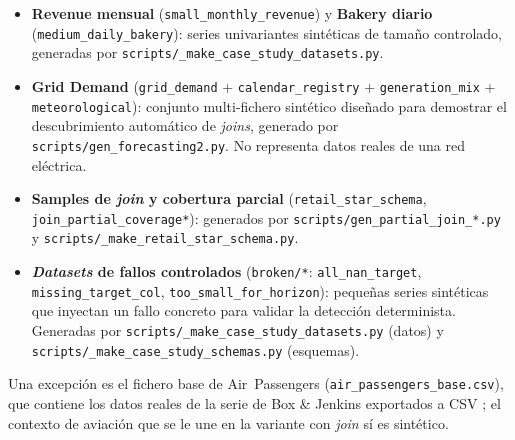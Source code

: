 \begin{itemize}
  \item \textbf{Revenue mensual} (\texttt{small\_monthly\_revenue}) y
        \textbf{Bakery diario} (\texttt{medium\_daily\_bakery}): series univariantes
        sintéticas de tamaño controlado, generadas por
        \texttt{scripts/\_make\_case\_study\_datasets.py}.
  \item \textbf{Grid Demand} (\texttt{grid\_demand} + \texttt{calendar\_registry} +
        \texttt{generation\_mix} + \texttt{meteorological}): conjunto multi-fichero
        sintético diseñado para demostrar el descubrimiento automático de \textit{joins},
        generado por \texttt{scripts/gen\_forecasting2.py}. No representa datos reales
        de una red eléctrica.
  \item \textbf{Samples de \textit{join} y cobertura parcial}
        (\texttt{retail\_star\_schema}, \texttt{join\_partial\_coverage*}): generados por
        \texttt{scripts/gen\_partial\_join\_*.py} y
        \texttt{scripts/\_make\_retail\_star\_schema.py}.
  \item \textbf{\textit{Datasets} de fallos controlados} (\texttt{broken/*}:
        \texttt{all\_nan\_target}, \texttt{missing\_target\_col},
        \texttt{too\_small\_for\_horizon}): pequeñas series sintéticas que inyectan un
        fallo concreto para validar la detección determinista. Generadas por
        \texttt{scripts/\_make\_case\_study\_datasets.py} (datos) y
        \texttt{scripts/\_make\_case\_study\_schemas.py} (esquemas).
\end{itemize}

\noindent
Una excepción es el fichero base de Air~Passengers
(\texttt{air\_passengers\_base.csv}), que contiene los datos reales de la serie de
Box \& Jenkins exportados a CSV \cite{ds_airpassengers}; el contexto de aviación que
se le une en la variante con \textit{join} sí es sintético.

